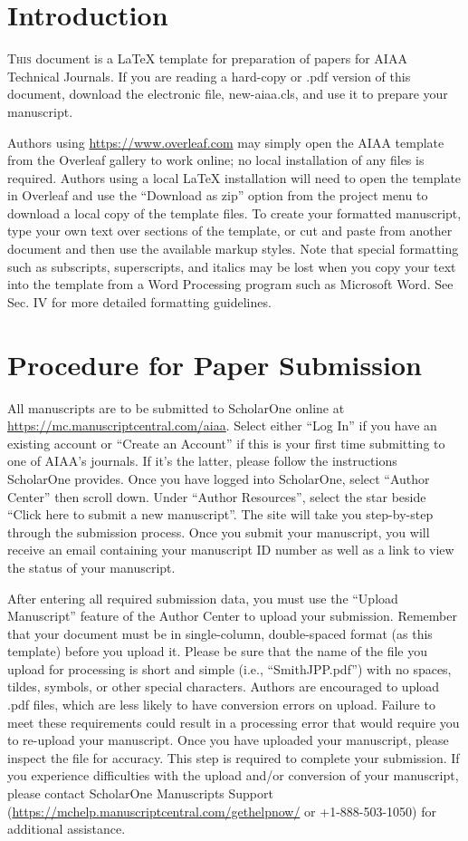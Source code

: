 \documentclass[journal ]{new-aiaa}
\begin{document}
\section{Introduction}
\lettrine{T}{his} document is a \LaTeX{} template for preparation of papers for AIAA Technical Journals. If you are reading a hard-copy or .pdf version of this document, download the electronic file, new-aiaa.cls, and use it to prepare your manuscript.

Authors using \url{https://www.overleaf.com} may simply open the AIAA template from the Overleaf gallery to work online; no local installation of any files is required. Authors using a local \LaTeX{} installation will need to open the template in Overleaf and use the ``Download as zip'' option from the project menu to download a local copy of the template files. To create your formatted manuscript, type your own text over sections of the template, or cut and paste from another document and then use the available markup styles. Note that special formatting such as subscripts, superscripts, and italics may be lost when you copy your text into the template from a Word Processing program such as Microsoft Word. See Sec. IV for more detailed formatting guidelines.


\section{Procedure for Paper Submission}

All manuscripts are to be submitted to ScholarOne online at \url{https://mc.manuscriptcentral.com/aiaa}. Select either “Log In” if you have an existing account or “Create an Account” if this is your first time submitting to one of AIAA’s journals. If it’s the latter, please follow the instructions ScholarOne provides. Once you have logged into ScholarOne, select “Author Center” then scroll down. Under “Author Resources”, select the star beside “Click here to submit a new manuscript”. The site will take you step-by-step through the submission process. Once you submit your manuscript, you will receive an email containing your manuscript ID number as well as a link to view the status of your manuscript. 

After entering all required submission data, you must use the “Upload Manuscript” feature of the Author Center to upload your submission. Remember that your document must be in single-column, double-spaced format (as this template) before you upload it. Please be sure that the name of the file you upload for processing is short and simple (i.e., “SmithJPP.pdf”) with no spaces, tildes, symbols, or other special characters. Authors are encouraged to upload .pdf files, which are less likely to have conversion errors on upload. Failure to meet these requirements could result in a processing error that would require you to re-upload your manuscript. Once you have uploaded your manuscript, please inspect the file for accuracy. This step is required to complete your submission. If you experience difficulties with the upload and/or conversion of your manuscript, please contact ScholarOne Manuscripts Support (\url{https://mchelp.manuscriptcentral.com/gethelpnow/} or +1-888-503-1050) for additional assistance. 
\end{document}

